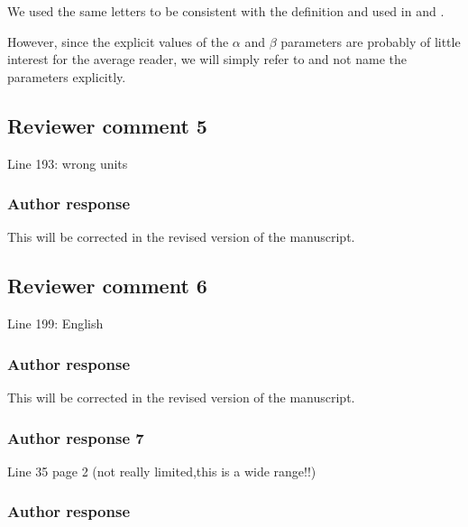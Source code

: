 \documentclass[11pt]{scrartcl}
\begin{document}
We used the same  letters to be consistent with the definition and used in
\cite{delanoe14} and \cite{cazenave18}.

However, since the explicit values of the $\alpha$ and $\beta$ parameters are
probably of little interest for the average reader, we will simply refer to
\cite{cazenave18} and not name the parameters explicitly.

\subsection*{Reviewer comment 5}
Line 193: wrong units 

\subsubsection*{Author response}

This will be corrected in the revised version of the manuscript.

\subsection*{Reviewer comment 6}

Line 199: English

\subsubsection*{Author response}


This will be corrected in the revised version of the manuscript.

%


\subsubsection*{Author response 7}
Line 35 page 2 (not really limited,this is a wide range!!)

\subsubsection*{Author response}
\end{document}
